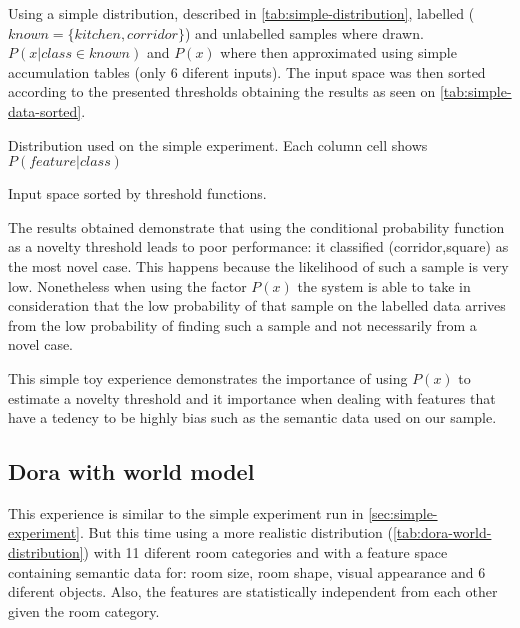 \documentclass[a4paper]{article}
\begin{document}
Using a simple distribution, described in \autoref{tab:simple-distribution},
labelled ($known = \{kitchen, corridor\}$)
and unlabelled samples where drawn.
$P(x|class \in known)$ and $P(x)$ where then approximated using simple accumulation tables
(only 6 diferent inputs).
The input space was then sorted according to the presented thresholds obtaining
the results as seen on \autoref{tab:simple-data-sorted}.

\begin{table}
\begin{center}

\end{center}
\caption{\label{tab:simple-distribution}Distribution used on the simple experiment. Each column cell shows $P(feature|class)$}
\end{table}

\begin{table}
\centering
{}
\qquad
{}
\caption{\label{tab:simple-data-sorted}Input space sorted by threshold functions.}
\end{table}

The results obtained demonstrate that using the conditional probability function
as a novelty threshold leads to poor performance: it classified (corridor,square) as
the most novel case.
This happens because the likelihood of such a sample is very low.
Nonetheless when using the factor $P(x)$ the system is able to take in consideration
that the low probability of that sample on the labelled data arrives from the low
probability of finding such a sample and not necessarily from a novel case.

This simple toy experience demonstrates the importance of using $P(x)$ to estimate a novelty
threshold and it importance when dealing with features that have a tedency to be highly bias
such as the semantic data used on our sample.



\subsection{Dora with world model}

This experience is similar to the simple experiment run in \autoref{sec:simple-experiment}.
But this time using a more realistic distribution (\autoref{tab:dora-world-distribution}) with
11 diferent room categories and with a feature space containing semantic data for:
room size, room shape, visual appearance and 6 diferent objects.
Also, the features are statistically independent from each other given the room category.
\end{document}
